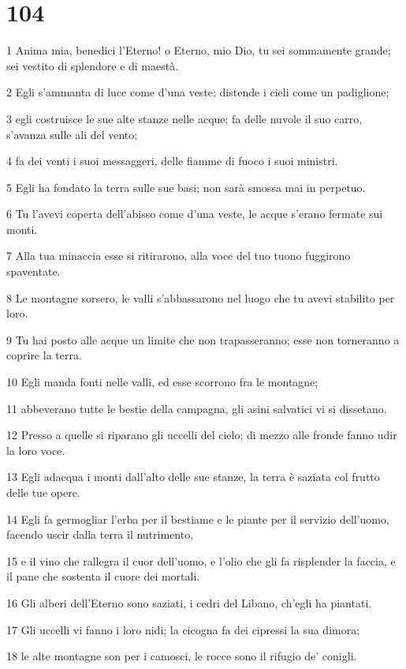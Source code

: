 \chapter{104}

\par 1 Anima mia, benedici l'Eterno! o Eterno, mio Dio, tu sei sommamente grande; sei vestito di splendore e di maestà.
\par 2 Egli s'ammanta di luce come d'una veste; distende i cieli come un padiglione;
\par 3 egli costruisce le sue alte stanze nelle acque; fa delle nuvole il suo carro, s'avanza sulle ali del vento;
\par 4 fa dei venti i suoi messaggeri, delle fiamme di fuoco i suoi ministri.
\par 5 Egli ha fondato la terra sulle sue basi; non sarà smossa mai in perpetuo.
\par 6 Tu l'avevi coperta dell'abisso come d'una veste, le acque s'erano fermate sui monti.
\par 7 Alla tua minaccia esse si ritirarono, alla voce del tuo tuono fuggirono spaventate.
\par 8 Le montagne sorsero, le valli s'abbassarono nel luogo che tu avevi stabilito per loro.
\par 9 Tu hai posto alle acque un limite che non trapasseranno; esse non torneranno a coprire la terra.
\par 10 Egli manda fonti nelle valli, ed esse scorrono fra le montagne;
\par 11 abbeverano tutte le bestie della campagna, gli asini salvatici vi si dissetano.
\par 12 Presso a quelle si riparano gli uccelli del cielo; di mezzo alle fronde fanno udir la loro voce.
\par 13 Egli adacqua i monti dall'alto delle sue stanze, la terra è saziata col frutto delle tue opere.
\par 14 Egli fa germogliar l'erba per il bestiame e le piante per il servizio dell'uomo, facendo uscir dalla terra il nutrimento,
\par 15 e il vino che rallegra il cuor dell'uomo, e l'olio che gli fa risplender la faccia, e il pane che sostenta il cuore dei mortali.
\par 16 Gli alberi dell'Eterno sono saziati, i cedri del Libano, ch'egli ha piantati.
\par 17 Gli uccelli vi fanno i loro nidi; la cicogna fa dei cipressi la sua dimora;
\par 18 le alte montagne son per i camosci, le rocce sono il rifugio de' conigli.
